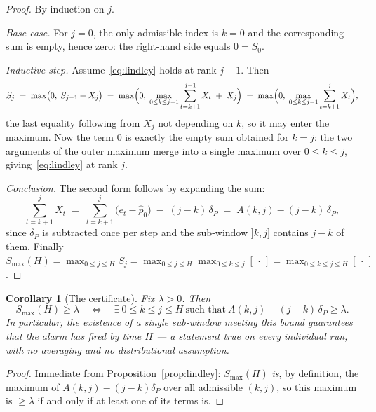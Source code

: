 \documentclass[10pt,a4paper]{article}
\newtheorem{corollary}{Corollary}
\begin{document}
\begin{proof}
By induction on $j$.

\smallskip
\noindent\emph{Base case.} For $j = 0$, the only admissible index is $k = 0$ and the
corresponding sum is empty, hence zero: the right-hand side equals $0 = S_0$.

\smallskip
\noindent\emph{Inductive step.} Assume~\eqref{eq:lindley} holds at rank $j-1$. Then
\[
  S_j \;=\; \max\bigl(0,\; S_{j-1} + X_j\bigr)
      \;=\; \max\Bigl(0,\; \max_{0 \le k \le j-1} \sum_{t=k+1}^{j-1} X_t \;+\; X_j\Bigr)
      \;=\; \max\Bigl(0,\; \max_{0 \le k \le j-1} \sum_{t=k+1}^{j} X_t\Bigr),
\]
the last equality following from $X_j$ not depending on $k$, so it may enter the
maximum. Now the term $0$ is exactly the empty sum obtained for $k = j$: the two
arguments of the outer maximum merge into a single maximum over $0 \le k \le j$,
giving~\eqref{eq:lindley} at rank $j$.

\smallskip
\noindent\emph{Conclusion.} The second form follows by expanding the sum:
\[
  \sum_{t=k+1}^{j} X_t
  \;=\; \sum_{t=k+1}^{j} \bigl(e_t - \hat p_0\bigr) \;-\; (j-k)\,\delta_P
  \;=\; A(k,j) - (j-k)\,\delta_P ,
\]
since $\delta_P$ is subtracted once per step and the sub-window $]k,j]$ contains
$j-k$ of them. Finally
$S_{\max}(H) = \max_{0 \le j \le H} S_j
 = \max_{0 \le j \le H} \max_{0 \le k \le j} [\,\cdot\,]
 = \max_{0 \le k \le j \le H} [\,\cdot\,]$.
\end{proof}


\begin{corollary}[The certificate]\label{cor:certificate}
Fix $\lambda > 0$. Then
\[
  S_{\max}(H) \ge \lambda
  \quad\Longleftrightarrow\quad
  \exists\ 0 \le k \le j \le H \ \text{such that}\ A(k,j) - (j-k)\,\delta_P \ge \lambda.
\]
In particular, the existence of a single sub-window meeting this bound
\emph{guarantees} that the alarm has fired by time $H$ --- a statement true on every
individual run, with no averaging and no distributional assumption.
\end{corollary}

\begin{proof}
Immediate from Proposition~\ref{prop:lindley}: $S_{\max}(H)$ \emph{is}, by definition,
the maximum of $A(k,j) - (j-k)\delta_P$ over all admissible $(k,j)$, so this maximum is
$\ge \lambda$ if and only if at least one of its terms is.
\end{proof}
\end{document}
